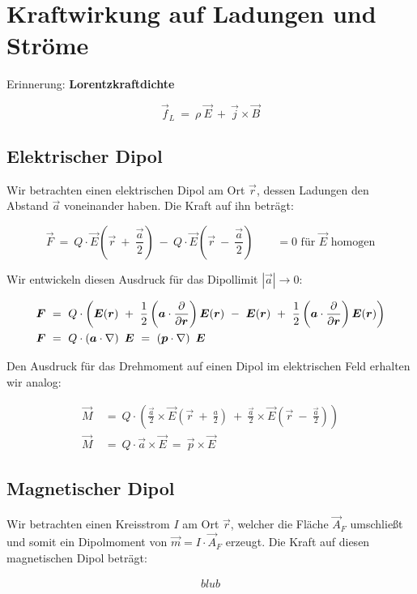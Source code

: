 \chapter{Kraftwirkung auf Ladungen und Ströme}

Erinnerung: \textbf{Lorentzkraftdichte}

\begin{equation*}
\vec{f}_L \ = \ \rho \ \vec{E} \ + \ \vec{j}\times\vec{B}
\end{equation*}

\section{Elektrischer Dipol}

Wir betrachten einen elektrischen Dipol am Ort $\vec{r}$, dessen Ladungen den Abstand $\vec{a}$ voneinander haben. Die Kraft auf ihn beträgt:

\begin{equation*}
\vec{F} \ = \ Q \cdot \vec{E}\left(\vec{r} \ + \ \frac{\vec{a}}{2}\right) \ - \ Q \cdot\vec{E} \left(\vec{r} \ - \ \frac{\vec{a}}{2}\right) \qquad =0 \text{ für $\vec{E}$ homogen}
\end{equation*}

Wir entwickeln diesen Ausdruck für das Dipollimit $|\vec{a}| \rightarrow 0$:

\begin{align*}
\vec{F}  \ &= \ Q \cdot \left( \vec{E} (\vec{r}) \ + \ \frac{1}{2} \left(\vec{a}\cdot\pdiff{}{\vec{r}}\right) \vec{E}(\vec{r}) \ - \ \vec{E}(\vec{r}) \ + \ \frac{1}{2} \left(\vec{a}\cdot\pdiff{}{\vec{r}}\right)\vec{E}(\vec{r})\right) \\
\vec{F} \ &= \ Q\cdot \left(\vec{a}\cdot\nabla\right) \ \vec{E}  \ = \ \left( \vec{p} \cdot \nabla\right) \ \vec{E}
\end{align*}

Den Ausdruck für das Drehmoment auf einen Dipol im elektrischen Feld erhalten wir analog:

\begin{align*}
\vec{M}  \ &= \ Q \cdot \left(\frac{\vec{a}}{2} \times \vec{E}\left(\vec{r} \ + \ \frac{a}{2}\right) \ + \ \frac{\vec{a}}{2} \times \vec{E}\left(\vec{r} \ - \ \frac{\vec{a}}{2}\right)\right)\\
\vec{M}  \ &= \ Q \cdot \vec{a}\times\vec{E}  \ = \ \vec{p}\times\vec{E} 
\end{align*}

\section{Magnetischer Dipol}

Wir betrachten einen Kreisstrom $I$ am Ort $\vec{r}$, welcher die Fläche $\vec{A}_F$ umschließt und somit ein Dipolmoment von $\vec{m} = I \cdot \vec{A}_F$ erzeugt. Die Kraft auf diesen magnetischen Dipol beträgt:

\begin{align*}
blub
\end{align*}